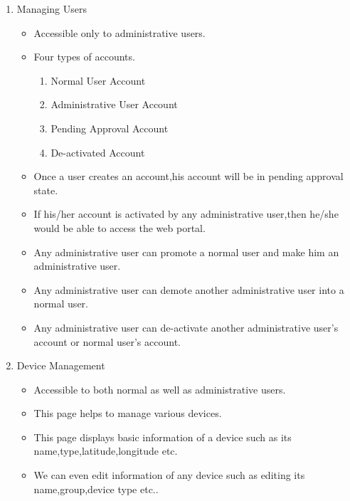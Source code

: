 \documentclass[a4paper,12pt,oneside]{book}
\begin{document}
\begin{enumerate}
\begin{itemize}
\begin{enumerate}
\begin{itemize}
                \end{itemize}
                \vspace{0.3cm}
            \item{Managing Users}
            \begin{itemize}
            \setlength\itemsep{0.2cm}
                \item{Accessible only to administrative users.}
                \item{Four types of accounts.}
                    \begin{enumerate}
                        \item{Normal User Account}
                        \item{Administrative User Account}
                        \item{Pending Approval Account }
                        \item{De-activated Account}
                    \end{enumerate}
                \item{Once a user creates an account,his account will be in pending approval state.}
                \item{If his/her account is activated by any administrative user,then he/she would be able to access the web portal.}
                \item{Any administrative user can promote a normal user and make him an administrative user.}
                \item{Any administrative user can demote another administrative user into a normal user.}
                \item{Any administrative user can de-activate another administrative user's account or normal user's account.}
            \end{itemize}
            \vspace{0.3cm}
            \item{Device Management}
                \begin{itemize}
                    \item{Accessible to both normal as well as administrative users.}
                    \item{This page helps to manage various devices.}
                    \item{This page displays basic information of a device such as its name,type,latitude,longitude etc.}
                    \item{We can even edit information of any device such as editing its name,group,device type etc..}

\end{itemize}
\end{enumerate}
\end{itemize}
\end{enumerate}
\end{document}
